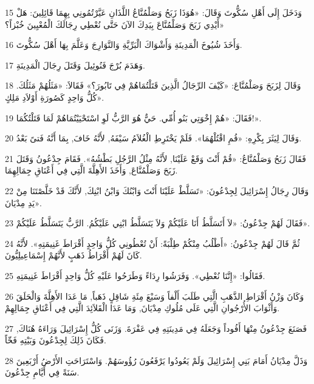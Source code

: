 \par 15 وَدَخَلَ إِلَى أَهْلِ سُكُّوتَ وَقَالَ: «هُوَذَا زَبَحُ وَصَلْمُنَّاعُ اللَّذَانِ عَيَّرْتُمُونِي بِهِمَا قَائِلِينَ: هَلْ أَيْدِي زَبَحَ وَصَلْمُنَّاعَ بِيَدِكَ الآنَ حَتَّى نُعْطِي رِجَالَكَ الْمُعْيِينَ خُبْزاً؟»
\par 16 وَأَخَذَ شُيُوخَ الْمَدِينَةِ وَأَشْوَاكَ الْبَرِّيَّةِ وَالنَّوَارِجَ وَعَلَّمَ بِهَا أَهْلَ سُكُّوتَ.
\par 17 وَهَدَمَ بُرْجَ فَنُوئِيلَ وَقَتَلَ رِجَالَ الْمَدِينَةِ.
\par 18 وَقَالَ لِزَبَحَ وَصَلْمُنَّاعَ: «كَيْفَ الرِّجَالُ الَّذِينَ قَتَلْتُمَاهُمْ فِي تَابُورَ؟» فَقَالاَ: «مَثَلُهُمْ مَثَلُكَ. كُلُّ وَاحِدٍ كَصُورَةِ أَوْلاَدِ مَلِكٍ».
\par 19 فَقَالَ: «هُمْ إِخْوَتِي بَنُو أُمِّي. حَيٌّ هُوَ الرَّبُّ لَوِ اسْتَحْيَيْتُمَاهُمْ لَمَا قَتَلْتُكُمَا!».
\par 20 وَقَالَ لِيَثَرَ بِكْرِهِ: «قُمِ اقْتُلْهُمَا». فَلَمْ يَخْتَرِطِ الْغُلاَمُ سَيْفَهُ, لأَنَّهُ خَافَ, بِمَا أَنَّهُ فَتىً بَعْدُ.
\par 21 فَقَالَ زَبَحُ وَصَلْمُنَّاعُ: «قُمْ أَنْتَ وَقَعْ عَلَيْنَا, لأَنَّهُ مِثْلُ الرَّجُلِ بَطْشُهُ». فَقَامَ جِدْعُونُ وَقَتَلَ زَبَحَ وَصَلْمُنَّاعَ, وَأَخَذَ الأَهِلَّةَ الَّتِي فِي أَعْنَاقِ جِمَالِهِمَا.
\par 22 وَقَالَ رِجَالُ إِسْرَائِيلَ لِجِدْعُونَ: «تَسَلَّطْ عَلَيْنَا أَنْتَ وَابْنُكَ وَابْنُ ابْنِكَ, لأَنَّكَ قَدْ خَلَّصْتَنَا مِنْ يَدِ مِدْيَانَ».
\par 23 فَقَالَ لَهُمْ جِدْعُونُ: «لاَ أَتَسَلَّطُ أَنَا عَلَيْكُمْ وَلاَ يَتَسَلَّطُ ابْنِي عَلَيْكُمُ. الرَّبُّ يَتَسَلَّطُ عَلَيْكُمْ».
\par 24 ثُمَّ قَالَ لَهُمْ جِدْعُونُ: «أَطْلُبُ مِنْكُمْ طِلْبَةً: أَنْ تُعْطُونِي كُلُّ وَاحِدٍ أَقْرَاطَ غَنِيمَتِهِ». لأَنَّهُ كَانَ لَهُمْ أَقْرَاطُ ذَهَبٍ لأَنَّهُمْ إِسْمَاعِيلِيُّونَ.
\par 25 فَقَالُوا: «إِنَّنَا نُعْطِي». وَفَرَشُوا رِدَاءً وَطَرَحُوا عَلَيْهِ كُلُّ وَاحِدٍ أَقْرَاطَ غَنِيمَتِهِ.
\par 26 وَكَانَ وَزْنُ أَقْرَاطِ الذَّهَبِ الَّتِي طَلَبَ أَلْفاً وَسَبْعَ مِئَةِ شَاقِلٍ ذَهَباً, مَا عَدَا الأَهِلَّةَ وَالْحَلَقَ وَأَثْوَابَ الأُرْجُوانِ الَّتِي عَلَى مُلُوكِ مِدْيَانَ, وَمَا عَدَا الْقَلاَئِدَ الَّتِي فِي أَعْنَاقِ جِمَالِهِمْ.
\par 27 فَصَنَعَ جِدْعُونُ مِنْهَا أَفُوداً وَجَعَلَهُ فِي مَدِينَتِهِ فِي عَفْرَةَ. وَزَنَى كُلُّ إِسْرَائِيلَ وَرَاءَهُ هُنَاكَ, فَكَانَ ذَلِكَ لِجِدْعُونَ وَبَيْتِهِ فَخّاً.
\par 28 وَذَلَّ مِدْيَانُ أَمَامَ بَنِي إِسْرَائِيلَ وَلَمْ يَعُودُوا يَرْفَعُونَ رُؤُوسَهُمْ. وَاسْتَرَاحَتِ الأَرْضُ أَرْبَعِينَ سَنَةً فِي أَيَّامِ جِدْعُونَ.
